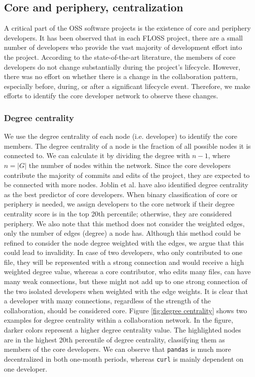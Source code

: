 \subsection{Core and periphery, centralization}
A critical part of the OSS software projects is the existence of core and periphery developers. It has been observed that in each FLOSS project, there are a small number of developers who provide the vast majority of development effort into the project. According to the state-of-the-art literature, the members of core developers do not change substantially during the project's lifecycle. However, there was no effort on whether there is a change in the collaboration pattern, especially before, during, or after a significant lifecycle event. Therefore, we make efforts to identify the core developer network to observe these changes.

\subsubsection{Degree centrality}
\label{sec:deg_centrality}

We use the degree centrality of each node (i.e. developer) to identify the core members. The degree centrality of a node is the fraction of all possible nodes it is connected to. We can calculate it by dividing the degree with $n-1$, where $n = |G|$ the number of nodes within the network. Since the core developers contribute the majority of commits and edits of the project, they are expected to be connected with more nodes. Joblin et al. \cite{joblinClassifyingDevelopersCore2016, joblinEvolutionaryTrendsDeveloper2017} have also identified degree centrality as the best predictor of core developers. When binary classification of core or periphery is needed, we assign developers to the core network if their degree centrality score is in the top 20th percentile; otherwise, they are considered periphery. We also note that this method does not consider the weighted edges, only the number of edges (degree) a node has. Although this method could be refined to consider the node degree weighted with the edges, we argue that this could lead to invalidity. In case of two developers, who only contributed to one file, they will be represented with a strong connection and would receive a high weighted degree value, whereas a core contributor, who edits many files, can have many weak connections, but these might not add up to one strong connection of the two isolated developers when weighted with the edge weights. It is clear that a developer with many connections, regardless of the strength of the collaboration, should be considered core. Figure \ref{fig:degree centrality} shows two examples for degree centrality within a collaboration network. In the figure, darker colors represent a higher degree centrality value. The highlighted nodes are in the highest 20th percentile of degree centrality, classifying them as members of the core developers. We can observe that \texttt{pandas} is much more decentralized in both one-month periods, whereas \texttt{curl} is mainly dependent on one developer.


